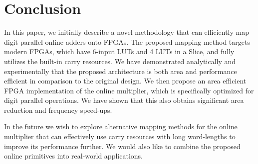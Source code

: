 \documentclass[conference]{IEEEtran}
\begin{document}
\section{Conclusion}
In this paper, we initially describe a novel methodology that can efficiently map digit parallel online adders onto FPGAs. The proposed mapping method targets modern FPGAs, which have 6-input LUTs and 4 LUTs in a Slice, and fully utilizes the built-in carry resources. We have demonstrated analytically and experimentally that the proposed architecture is both area and performance efficient in comparison to the original design. We then propose an area efficient FPGA implementation of the online multiplier, which is specifically optimized for digit parallel operations. We have shown that this also obtains significant area reduction and frequency speed-ups.

In the future we wish to explore alternative mapping methods for the online multiplier that can effectively use carry resources with long word-lengths to improve  its performance further. We would also like to combine the proposed online primitives into real-world applications.











%


\end{document}
